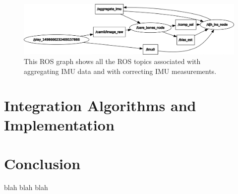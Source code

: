 \documentclass[11pt,a4paper]{article}
\begin{document}
\begin{figure}
	\centering
	\includegraphics[scale=0.42]{withonlinebias}
	\caption{This ROS graph shows all the ROS topics associated with aggregating IMU data and with correcting IMU measurements.}
	\label{fig:withonlinebias}
\end{figure}


\section{Integration Algorithms and Implementation}

\section{Conclusion}

blah blah blah \cite{Trawny:2005,Forster:2017,Forster:2015,Eckenhoff:2016}



\end{document}
